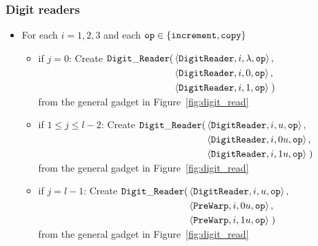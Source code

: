 \subsubsection{ Digit readers }

\begin{itemize}

\item For each $i = 1,2,3$ and each ${\tt op} \in \{{\tt increment}, {\tt copy} \}$

    \begin{itemize}
        \item if $j = 0$:
        Create
        $\begin{aligned}[t]
            {\tt Digit\_Reader}(& \left\langle {\tt DigitReader}, i, \lambda, {\tt op} \right\rangle, \\
                     & \left\langle {\tt DigitReader}, i, 0, {\tt op} \right\rangle, \\
                     & \left\langle {\tt DigitReader}, i, 1, {\tt op} \right\rangle \;)
        \end{aligned}$\\
        from the general gadget in Figure~\ref{fig:digit_read}

        \item if $1 \leqslant j \leqslant l -2$:
        Create
        $\begin{aligned}[t]
        {\tt Digit\_Reader}(& \left\langle {\tt DigitReader}, i, u, {\tt op} \right\rangle, \\
                 & \left\langle {\tt DigitReader}, i, 0u, {\tt op} \right\rangle, \\
                 & \left\langle {\tt DigitReader}, i, 1u, {\tt op} \right\rangle \;)
        \end{aligned}$\\
        from the general gadget in Figure~\ref{fig:digit_read}

        \item if $j = l - 1$:
        Create
        $\begin{aligned}[t]
            {\tt Digit\_Reader}(& \left\langle {\tt DigitReader}, i, u, {\tt op} \right\rangle, \\
                     & \left\langle {\tt PreWarp}, i, 0u, {\tt op} \right\rangle, \\
                     & \left\langle {\tt PreWarp}, i, 1u, {\tt op} \right\rangle \;)
        \end{aligned}$\\
        from the general gadget in Figure~\ref{fig:digit_read}

    \end{itemize}


\end{itemize}

